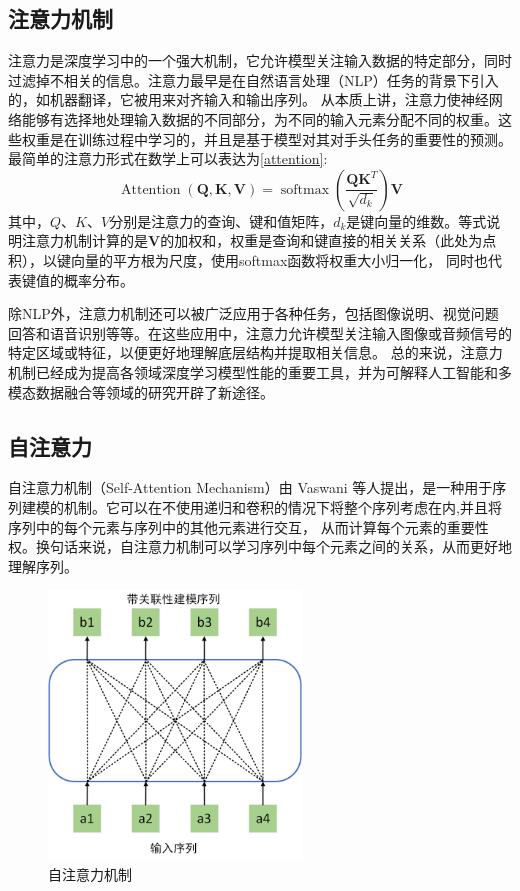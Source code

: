 \subsection{注意力机制}
注意力是深度学习中的一个强大机制，它允许模型关注输入数据的特定部分，同时过滤掉不相关的信息。注意力最早是在自然语言处理（NLP）任务的背景下引入的，如机器翻译，它被用来对齐输入和输出序列。
从本质上讲，注意力使神经网络能够有选择地处理输入数据的不同部分，为不同的输入元素分配不同的权重。这些权重是在训练过程中学习的，并且是基于模型对其对手头任务的重要性的预测。
最简单的注意力形式在数学上可以表达为\eqref{attention}:
\begin{equation}
	\label{attention}
	\operatorname{Attention}(\mathbf{Q}, \mathbf{K}, \mathbf{V})=\operatorname{softmax}\left(\frac{\mathbf{Q K}^T}{\sqrt{d_k}}\right) \mathbf{V}
\end{equation}
其中，$Q$、$K$、$V$分别是注意力的查询、键和值矩阵，$d_k$是键向量的维数。等式说明注意力机制计算的是$\mathbf{V}$的加权和，权重是查询和键直接的相关关系（此处为点积），以键向量的平方根为尺度，使用softmax函数将权重大小归一化，
同时也代表键值的概率分布。

除NLP外，注意力机制还可以被广泛应用于各种任务，包括图像说明、视觉问题回答和语音识别等等。在这些应用中，注意力允许模型关注输入图像或音频信号的特定区域或特征，以便更好地理解底层结构并提取相关信息。
总的来说，注意力机制已经成为提高各领域深度学习模型性能的重要工具，并为可解释人工智能和多模态数据融合等领域的研究开辟了新途径。

\subsection{自注意力}
自注意力机制（Self-Attention Mechanism）由 Vaswani 等人\cite{vaswani2017attention}提出，是一种用于序列建模的机制。它可以在不使用递归和卷积的情况下将整个序列考虑在内,并且将序列中的每个元素与序列中的其他元素进行交互，
从而计算每个元素的重要性权。换句话来说，自注意力机制可以学习序列中每个元素之间的关系，从而更好地理解序列。
\begin{figure}[htbp]
	\centering	
	\includegraphics[width=0.6\textwidth]{Fig/myfig/chapter2/selfatt.png}  %
	\caption{\label{sys_need}自注意力机制} 
\end{figure}

